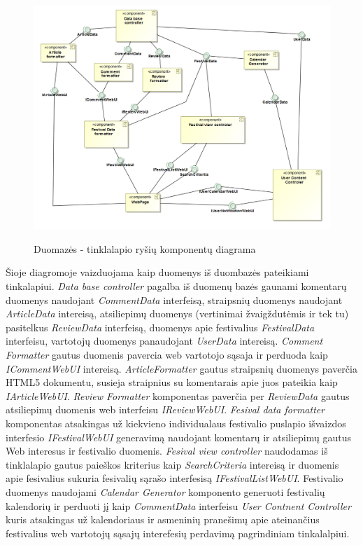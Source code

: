 ﻿\documentclass{VUMIFPSkursinis}
\begin{document}
\begin{figure}[H]
\centering
    \includegraphics[scale=0.55]{img/PSI3/DataToWeb.PNG}
	\label{mantas:1}
	\caption{Duomazės - tinklalapio ryšių komponentų diagrama}
\end{figure}
Šioje diagromoje vaizduojama kaip duomenys iš duombazės pateikiami tinkalapiui.
 \textit{Data base controller} pagalba iš duomenų bazės gaunami komentarų duomenys naudojant \textit{CommentData} interfeisą, straipsnių duomenys naudojant \textit{ArticleData} intereisą, atsiliepimų duomenys (vertinimai žvaigždutėmis ir tek tu) pasitelkus \textit{ReviewData} interfeisą, duomenys apie festivalius \textit{FestivalData} interfeisu, vartotojų duomenys panaudojant \textit{UserData} intereisą.
 \textit{Comment Formatter} gautus duomenis pavercia web vartotojo sąsaja ir perduoda kaip \textit{ICommentWebUI} intereisą.
 \textit{ArticleFormatter} gautus straipsnių duomenys paverčia HTML5 dokumentu, susieja straipnius su komentarais apie juos pateikia kaip \textit{IArticleWebUI}.
 \textit{Review Formatter} komponentas paverčia per \textit{ReviewData} gautus atsiliepimų duomenis web interfeisu \textit{IReviewWebUI}.
 \textit{Fesival data formatter} komponentas atsakingas už kiekvieno individualaus festivalio puslapio išvaizdos interfesio \textit{IFestivalWebUI} generavimą naudojant komentarų ir atsiliepimų gautus Web interesus ir festivalio duomenis.
 \textit{Fesival view controller} naudodamas iš tinklalapio gautus paieškos kriterius kaip \textit{SearchCriteria} intereisą ir duomenis apie fesivalius sukuria fesivalių sąrašo interfesisą \textit{IFestivalListWebUI}.
 Festivalio duomenys naudojami \textit{Calendar Generator} komponento generuoti festivalių kalendorių ir perduoti jį kaip \textit{CommentData} interfeisu \textit{User Contnent Controller} kuris atsakingas už kalendoriaus ir asmeninių pranešimų apie ateinančius festivalius web vartotojų sąsajų interefesių perdavimą pagrindiniam tinkalalpiui. 
\end{document}
